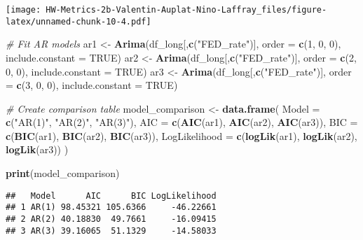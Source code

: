 \documentclass[
]{article}
\newenvironment{Shaded}{\begin{snugshade}}{\end{snugshade}}
\newcommand{\AttributeTok}[1]{\textcolor[rgb]{0.13,0.29,0.53}{#1}}
\newcommand{\CommentTok}[1]{\textcolor[rgb]{0.56,0.35,0.01}{\textit{#1}}}
\newcommand{\ConstantTok}[1]{\textcolor[rgb]{0.56,0.35,0.01}{#1}}
\newcommand{\DecValTok}[1]{\textcolor[rgb]{0.00,0.00,0.81}{#1}}
\newcommand{\FunctionTok}[1]{\textcolor[rgb]{0.13,0.29,0.53}{\textbf{#1}}}
\newcommand{\NormalTok}[1]{#1}
\newcommand{\OtherTok}[1]{\textcolor[rgb]{0.56,0.35,0.01}{#1}}
\newcommand{\StringTok}[1]{\textcolor[rgb]{0.31,0.60,0.02}{#1}}
\begin{document}
\texttt{[image: HW-Metrics-2b-Valentin-Auplat-Nino-Laffray\_files/figure-latex/unnamed-chunk-10-4.pdf]}

\begin{Shaded}
\begin{Highlighting}[]
\CommentTok{\# Fit AR models}
\NormalTok{ar1 }\OtherTok{\textless{}{-}} \FunctionTok{Arima}\NormalTok{(df\_long[,}\FunctionTok{c}\NormalTok{(}\StringTok{"FED\_rate"}\NormalTok{)], }\AttributeTok{order =} \FunctionTok{c}\NormalTok{(}\DecValTok{1}\NormalTok{, }\DecValTok{0}\NormalTok{, }\DecValTok{0}\NormalTok{), }\AttributeTok{include.constant =} \ConstantTok{TRUE}\NormalTok{)}
\NormalTok{ar2 }\OtherTok{\textless{}{-}} \FunctionTok{Arima}\NormalTok{(df\_long[,}\FunctionTok{c}\NormalTok{(}\StringTok{"FED\_rate"}\NormalTok{)], }\AttributeTok{order =} \FunctionTok{c}\NormalTok{(}\DecValTok{2}\NormalTok{, }\DecValTok{0}\NormalTok{, }\DecValTok{0}\NormalTok{), }\AttributeTok{include.constant =} \ConstantTok{TRUE}\NormalTok{)}
\NormalTok{ar3 }\OtherTok{\textless{}{-}} \FunctionTok{Arima}\NormalTok{(df\_long[,}\FunctionTok{c}\NormalTok{(}\StringTok{"FED\_rate"}\NormalTok{)], }\AttributeTok{order =} \FunctionTok{c}\NormalTok{(}\DecValTok{3}\NormalTok{, }\DecValTok{0}\NormalTok{, }\DecValTok{0}\NormalTok{), }\AttributeTok{include.constant =} \ConstantTok{TRUE}\NormalTok{)}

\CommentTok{\# Create comparison table}
\NormalTok{model\_comparison }\OtherTok{\textless{}{-}} \FunctionTok{data.frame}\NormalTok{(}
  \AttributeTok{Model =} \FunctionTok{c}\NormalTok{(}\StringTok{"AR(1)"}\NormalTok{, }\StringTok{"AR(2)"}\NormalTok{, }\StringTok{"AR(3)"}\NormalTok{),}
  \AttributeTok{AIC =} \FunctionTok{c}\NormalTok{(}\FunctionTok{AIC}\NormalTok{(ar1), }\FunctionTok{AIC}\NormalTok{(ar2), }\FunctionTok{AIC}\NormalTok{(ar3)),}
  \AttributeTok{BIC =} \FunctionTok{c}\NormalTok{(}\FunctionTok{BIC}\NormalTok{(ar1), }\FunctionTok{BIC}\NormalTok{(ar2), }\FunctionTok{BIC}\NormalTok{(ar3)),}
  \AttributeTok{LogLikelihood =} \FunctionTok{c}\NormalTok{(}\FunctionTok{logLik}\NormalTok{(ar1), }\FunctionTok{logLik}\NormalTok{(ar2), }\FunctionTok{logLik}\NormalTok{(ar3))}
\NormalTok{)}

\FunctionTok{print}\NormalTok{(model\_comparison)}
\end{Highlighting}
\end{Shaded}

\begin{verbatim}
##   Model      AIC      BIC LogLikelihood
## 1 AR(1) 98.45321 105.6366     -46.22661
## 2 AR(2) 40.18830  49.7661     -16.09415
## 3 AR(3) 39.16065  51.1329     -14.58033
\end{verbatim}
\end{document}
